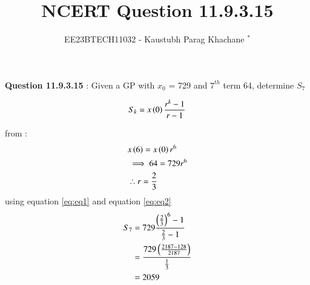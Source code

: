 \documentclass[journal,12pt,twocolumn]{IEEEtran}
\theoremstyle{remark}
\begin{document}

\vspace{3cm}

\Large\title{NCERT Question 11.9.3.15}
\large\author{EE23BTECH11032 - Kaustubh Parag Khachane $^{*}$%
}
\maketitle
\newpage
\bigskip

\renewcommand{\thefigure}{\theenumi}
\renewcommand{\thetable}{\theenumi}
\large\textbf{Question 11.9.3.15} : Given a GP with $x_0$ = 729 and \(7^{th}\) term 64, determine $S_{7}$

\solution


\begin{align}
    S_k = x\left(0\right)\frac{r^k -1}{r-1} \label{eq:eq1}
\end{align}

from  :
\begin{align}
    &x\left(6\right) = x\left(0\right)r^6\\
    &\implies 64 = 729r^6\\
    &\therefore r = \frac{2}{3}\label{eq:eq2}
\end{align}
    using equation \eqref{eq:eq1} and equation \eqref{eq:eq2}
\begin{align}
    S_7 &= 729\frac{\left(\frac{2}{3}\right)^6 - 1}{\frac{2}{3} - 1}\\
  & = \frac{729\left(\frac{2187 - 128}{2187}\right)}{\frac{1}{3}}\\
  & = 2059\notag
\end{align}
\end{document}
